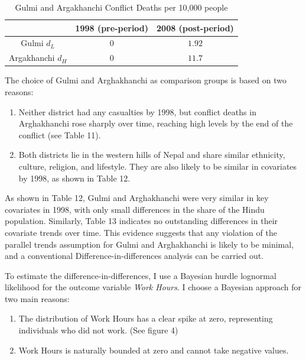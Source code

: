 \documentclass[12pt,a4paper]{article}
\providecommand{\tabularnewline}{\\}
\begin{document}
\begin{table}[H]
	\caption{Gulmi and Argakhanchi Conflict Deaths per 10,000 people}
	
	\renewcommand{\arraystretch}{1.2}
	\vspace{1em}
	\centering{}%
	\begin{tabular}{c|c|c}
		& 1998 (pre-period) & 2008 (post-period)\tabularnewline
		\hline 
		Gulmi $d_{L}$ & $0$ & $1.92$\tabularnewline
		Argakhanchi $d_{H}$ & $0$ & $11.7$\tabularnewline
		\hline 
	\end{tabular}
\end{table}

The choice of Gulmi and Arghakhanchi as comparison groups is based on two reasons:

\begin{enumerate}
	\item Neither district had any casualties by 1998, but conflict deaths in Arghakhanchi rose sharply over time, reaching high levels by the end of the conflict (see Table 11).
	
	\item Both districts lie in the western hills of Nepal and share similar ethnicity, culture, religion, and lifestyle. They are also likely to be similar in covariates by 1998, as shown in Table 12.
\end{enumerate}



As shown in Table 12, Gulmi and Arghakhanchi were very similar in key covariates in 1998, with only small differences in the share of the Hindu population. Similarly, Table 13 indicates no outstanding differences in their covariate trends over time. This evidence suggests that any violation of the parallel trends assumption for Gulmi and Arghakhanchi is likely to be minimal, and a conventional Difference-in-differences analysis can be carried out.



To estimate the difference-in-differences, I use a Bayesian hurdle lognormal likelihood for the outcome variable \textit{Work Hours}. I choose a Bayesian approach for two main reasons:

\begin{enumerate}
	\item The distribution of Work Hours has a clear spike at zero, representing individuals who did not work. (See figure 4)
	\item Work Hours is naturally bounded at zero and cannot take negative values.
\end{enumerate}
\end{document}
